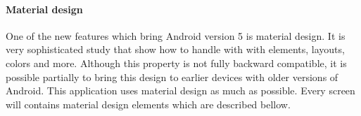 \paragraph{Material design}
One of the new features which bring Android version 5 is material design. It is very sophisticated study that show how
to handle with with elements, layouts, colors and more. Although this property is not fully backward compatible, it is
possible partially to bring this design to earlier devices with older versions of Android. This application uses
material design as much as possible. Every screen will contains material design elements which are described bellow.

